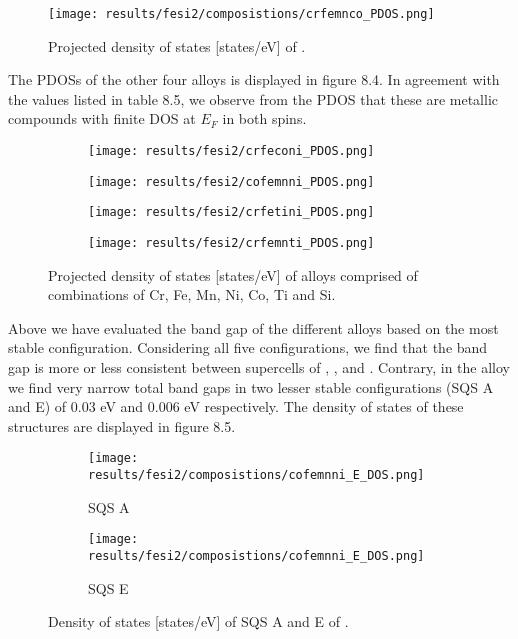 \begin{figure}[H]
\centering
\texttt{[image: results/fesi2/composistions/crfemnco\_PDOS.png]}
\caption{Projected density of states [states/eV] of .}
\end{figure}

The PDOSs of the other four alloys is displayed in figure 8.4. In agreement with the values listed in table 8.5, we observe from the PDOS that these are metallic compounds with finite DOS at $E_F$ in both spins. 
 
\begin{figure}[H]
\begin{subfigure}{.5\textwidth}
\texttt{[image: results/fesi2/crfeconi\_PDOS.png]}
\caption{}
\end{subfigure}
\begin{subfigure}{.5\textwidth}
\texttt{[image: results/fesi2/cofemnni\_PDOS.png]}
\caption{}
\end{subfigure}
\begin{subfigure}{.5\textwidth}
\texttt{[image: results/fesi2/crfetini\_PDOS.png]}
\caption{}
\end{subfigure}
\begin{subfigure}{.5\textwidth}
\texttt{[image: results/fesi2/crfemnti\_PDOS.png]}
\caption{}
\end{subfigure}
\caption{Projected density of states [states/eV] of alloys comprised of combinations of Cr, Fe, Mn, Ni, Co, Ti and Si.}
\end{figure}

Above we have evaluated the band gap of the different alloys based on the most stable configuration. Considering all five configurations, we find that the band gap is more or less consistent between supercells of ,  ,  and . Contrary, in the  alloy we find very narrow total band gaps in two lesser stable configurations (SQS A and E) of 0.03 eV and 0.006 eV respectively. The density of states of these structures are displayed in figure 8.5.

\begin{figure}[H]
\begin{subfigure}{.5\textwidth}
\texttt{[image: results/fesi2/composistions/cofemnni\_E\_DOS.png]}
\caption{SQS A}
\end{subfigure}
\begin{subfigure}{.5\textwidth}
\texttt{[image: results/fesi2/composistions/cofemnni\_E\_DOS.png]}
\caption{SQS E}
\end{subfigure}
\caption{Density of states [states/eV] of SQS A and E of .}
\end{figure} 

